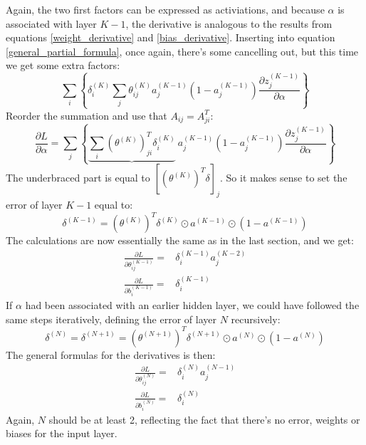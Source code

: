 \documentclass[12pt, a4paper]{article}
\numberwithin{equation}{section}
\begin{document}
Again, the two first factors can be expressed as activiations, and because $\alpha$ is associated with layer $K-1$, the derivative is analogous to the results from equations \ref{weight_derivative} and \ref{bias_derivative}. Inserting into equation \ref{general_partial_formula}, once again, there's some cancelling out, but this time we get some extra factors:
\begin{equation}
\sum_i\left\{\delta^{(K)}_i\sum_j\theta^{(K)}_{ij}a_j^{(K-1)}\left(1-a_j^{(K-1)}\right)\frac{\partial z^{(K-1)}_j}{\partial\alpha}\right\}
\end{equation}
Reorder the summation and use that $A_{ij}=A^T_{ji}$:
\begin{equation}
\frac{\partial L}{\partial\alpha}=\sum_{j}\left\{\underbrace{\sum_i\left(\theta^{(K)}\right)^T_{ji}\delta^{(K)}_i}\ a_j^{(K-1)}\left(1-a_j^{(K-1)}\right)\frac{\partial z^{(K-1)}_j}{\partial\alpha}\right\}
\end{equation}
The underbraced part is equal to $\left[\left(\theta^{(K)}\right)^T\delta\right]_j$. So it makes sense to set the error of layer $K-1$ equal to:
\begin{equation}
\delta^{(K-1)}=\left(\theta^{(K)}\right)^T\delta^{(K)}\odot a^{(K-1)}\odot\left(1-a^{(K-1)}\right)
\end{equation}
The calculations are now essentially the same as in the last section, and we get:
\begin{align}
\frac{\partial L}{\partial\theta^{(K-1)}_{ij}}=&\delta^{(K-1)}_i a^{(K-2)}_j\\
\frac{\partial L}{\partial b^{(K-1)}_i}=&\delta^{(K-1)}_i
\end{align}
If $\alpha$ had been associated with an earlier hidden layer, we could have followed the same steps iteratively, defining the error of layer $N$ recursively:
\begin{equation}
\delta^{(N)}=\delta^{(N+1)}=\left(\theta^{(N+1)}\right)^T\delta^{(N+1)}\odot a^{(N)}\odot\left(1-a^{(N)}\right)
\end{equation}
The general formulas for the derivatives is then:
\begin{align}
\frac{\partial L}{\partial\theta^{(N)}_{ij}}=&\delta^{(N)}_i a^{(N-1)}_j\\
\frac{\partial L}{\partial b^{(N)}_i}=&\delta^{(N)}_i
\end{align}
Again, $N$ should be at least 2, reflecting the fact that there's no error, weights or biases for the input layer.
\end{document}
